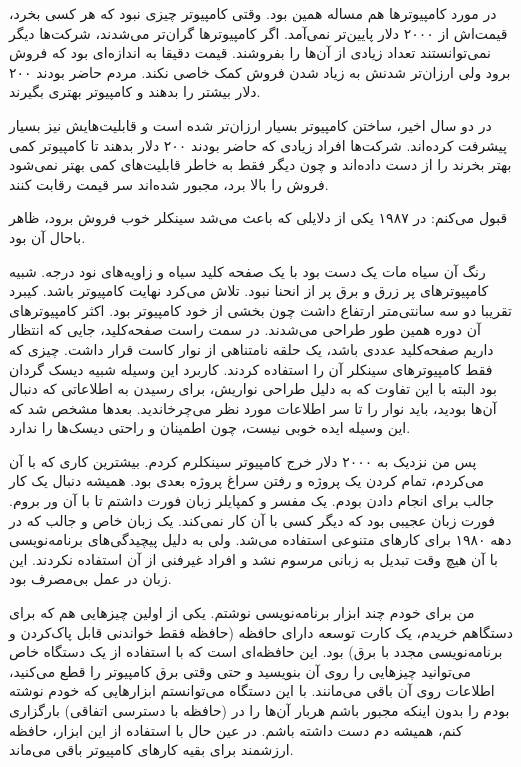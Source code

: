 در مورد کامپیوترها هم مساله همین بود. وقتی کامپیوتر چیزی نبود که هر
کسی بخرد، قیمت‌اش از ۲۰۰۰ دلار پایین‌تر نمی‌آمد. اگر کامپیوترها گران‌تر
می‌شدند، شرکت‌ها دیگر نمی‌توانستند تعداد زیادی از آن‌ها را بفروشند. قیمت
دقیقا به اندازه‌ای بود که فروش برود ولی ارزان‌تر شدنش به زیاد شدن فروش
کمک خاصی نکند. مردم حاضر بودند ۲۰۰ دلار بیشتر را بدهند و کامپیوتر
بهتری بگیرند.

در دو سال اخیر، ساختن کامپیوتر بسیار ارزان‌تر شده است و قابلیت‌هایش نیز
بسیار پیشرفت کرده‌اند. شرکت‌ها افراد زیادی که حاضر بودند ۲۰۰ دلار بدهند
تا کامپیوتر کمی بهتر بخرند را از دست داده‌اند و چون دیگر فقط به خاطر
قابلیت‌های کمی بهتر نمی‌شود فروش را بالا برد، مجبور شده‌اند سر قیمت رقابت
کنند.

قبول می‌کنم: در ۱۹۸۷ یکی از دلایلی که باعث می‌شد سینکلر خوب فروش برود،
ظاهر باحال آن بود.

رنگ آن سیاه مات یک دست بود با یک صفحه کلید سیاه و زاویه‌های نود
درجه. شبیه کامپیوترهای پر زرق و برق پر از انحنا نبود. تلاش می‌کرد نهایت
کامپیوتر باشد. کیبرد تقریبا دو سه سانتی‌متر ارتفاع داشت چون بخشی از خود
کامپیوتر بود. اکثر کامپیوتر‌های آن دوره همین طور طراحی می‌شدند. در سمت
راست صفحه‌کلید، جایی که انتظار داریم صفحه‌کلید عددی باشد، یک حلقه
نامتناهی از نوار کاست قرار داشت. چیزی که فقط کامپیوترهای سینکلر آن را
استفاده کردند. کاربرد این وسیله شبیه دیسک گردان بود البته با این تفاوت
که به دلیل طراحی نواریش، برای رسیدن به اطلاعاتی که دنبال آن‌ها بودید،
باید نوار را تا سر اطلاعات مورد نظر می‌چرخاندید. بعدها مشخص شد که این
وسیله ایده خوبی نیست، چون اطمینان و راحتی دیسک‌ها را ندارد.

پس من نزدیک به ۲۰۰۰ دلار خرج کامپیوتر سینکلرم کردم. بیشترین کاری که با
آن می‌کردم، تمام کردن یک پروژه و رفتن سراغ پروژه بعدی بود. همیشه دنبال
یک کار جالب برای انجام دادن بودم. یک مفسر و کمپایلر زبان
فورت داشتم تا با آن ور بروم. فورت زبان عجیبی بود که
دیگر کسی با آن کار نمی‌کند. یک زبان خاص و جالب که در دهه ۱۹۸۰ برای
کارهای متنوعی استفاده می‌شد. ولی به دلیل پیچیدگی‌های برنامه‌نویسی با آن
هیچ وقت تبدیل به زبانی مرسوم نشد و افراد غیرفنی از آن استفاده
نکردند. این زبان در عمل بی‌مصرف بود.

من برای خودم چند ابزار برنامه‌نویسی نوشتم. یکی از اولین چیزهایی هم که
برای دستگاهم خریدم، یک کارت توسعه دارای حافظه  (حافظه فقط
خواندنی قابل پاک‌کردن و برنامه‌نویسی مجدد با برق) بود. این حافظه‌ای است
که با استفاده از یک دستگاه خاص می‌توانید چیزهایی را روی آن بنویسید و
حتی وقتی برق کامپیوتر را قطع می‌کنید، اطلاعات روی آن باقی می‌مانند. با
این دستگاه می‌توانستم ابزارهایی که خودم نوشته بودم را بدون اینکه مجبور
باشم هربار آن‌ها را در  (حافظه با دسترسی اتفاقی) بارگزاری کنم، همیشه
دم دست داشته باشم. در عین حال با استفاده از این ابزار، حافظه ارزشمند
 برای بقیه کارهای کامپیوتر باقی می‌ماند.

